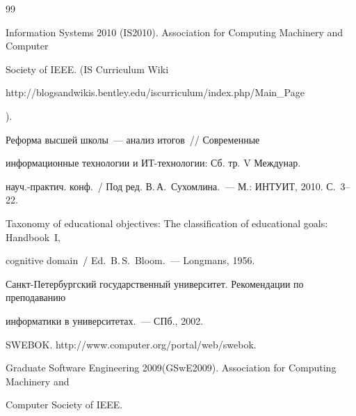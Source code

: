 {{\begin{thebibliography}{99}

Information Systems 2010 (IS2010). Association for Computing Machinery and Computer 

Society of IEEE. (IS Curriculum Wiki {\sf 

http://blogsandwikis.bentley.edu/\linebreak iscurriculum/index.php/Main\_Page}).








 Реформа высшей школы~--- анализ итогов~/\!\!/ Современные 

информационные технологии и ИТ-технологии: Сб. тр. V Междунар. 

науч.-практич. конф.~/ Под ред. В.\,А.~Сухомлина.~--- М.: ИНТУИТ, 2010. С.~3--22.




Taxonomy of educational objectives: The classification of educational goals: Handbook~I, 

cognitive domain~/ Ed.\ B.\,S.~Bloom.~--- Longmans, 1956.




Санкт-Петербургский государственный университет. Рекомендации по преподаванию 

информатики в университетах.~--- СПб., 2002. 








    \label{end\stat}

    


SWEBOK. {\sf http://www.computer.org/portal/web/swebok}.




Graduate Software Engineering 2009(GSwE2009). Association for Computing Machinery and 

Computer Society of IEEE.    



 \end{thebibliography}

}

}

